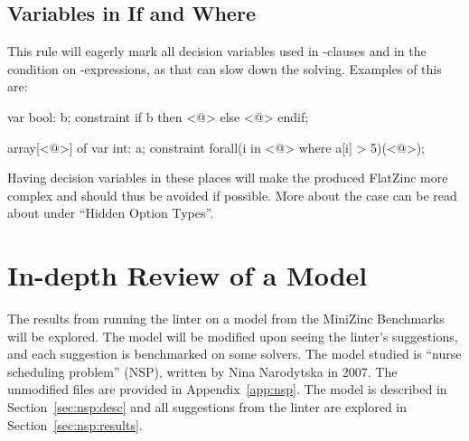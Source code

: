 \documentclass[a4paper,12pt]{article}
\begin{document}
\subsection{Variables in If and Where}\label{sec:rule:varif}
This rule will eagerly mark all decision variables used in -clauses and in the condition
on -expressions, as that can slow down the solving. Examples of this are:

\begin{mznnobreak}
var bool: b;
constraint if b then <@\dots@> else <@\dots@> endif;
\end{mznnobreak}
\begin{mznnobreak}
array[<@\dots@>] of var int: a;
constraint forall(i in <@\dots@> where a[i] > 5)(<@\dots@>);
\end{mznnobreak}

Having decision variables in these places will make the produced FlatZinc more complex and should thus be avoided if possible.
More about the  case can be read about under ``Hidden Option
Types''.%

\section{In-depth Review of a Model}\label{sec:nsp}
The results from running the linter on a model from the MiniZinc Benchmarks~\cite{mznbench} will be explored.
The model will be modified upon seeing
the linter's suggestions, and each suggestion is benchmarked on some solvers. The model studied is ``nurse scheduling
problem'' (NSP), written by Nina Narodytska in 2007.
The unmodified files are provided in Appendix~\ref{app:nsp}.
The model is described in Section~\ref{sec:nsp:desc} and all suggestions from the linter are explored
in Section~\ref{sec:nsp:results}.
\end{document}
